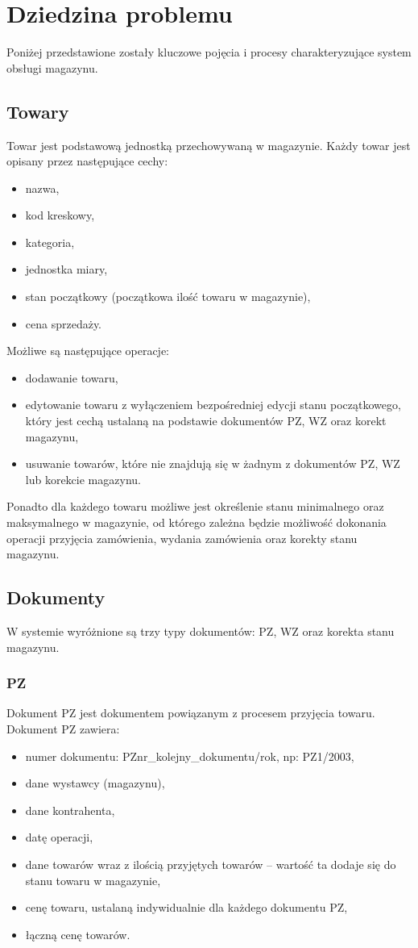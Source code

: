 \section{Dziedzina problemu}
Poniżej przedstawione zostały kluczowe pojęcia i procesy charakteryzujące system obsługi magazynu.

\subsection{Towary}
Towar jest podstawową jednostką przechowywaną w magazynie. Każdy towar jest opisany przez następujące cechy:
\begin{itemize}
	\item nazwa,
	\item kod kreskowy,
	\item kategoria,
	\item jednostka miary,
	\item stan początkowy (początkowa ilość towaru w magazynie),
	\item cena sprzedaży.
\end{itemize}

Możliwe są następujące operacje:
\begin{itemize}
	\item dodawanie towaru,
	\item edytowanie towaru z wyłączeniem bezpośredniej edycji stanu początkowego, który jest cechą ustalaną na podstawie dokumentów PZ, WZ oraz korekt magazynu,
	\item usuwanie towarów, które nie znajdują się w żadnym z dokumentów PZ, WZ lub korekcie magazynu.
\end{itemize}

Ponadto dla każdego towaru możliwe jest określenie stanu minimalnego oraz maksymalnego w magazynie, od którego zależna będzie możliwość dokonania operacji przyjęcia zamówienia, wydania zamówienia oraz korekty stanu magazynu.

\subsection{Dokumenty}
W systemie wyróżnione są trzy typy dokumentów: PZ, WZ oraz korekta stanu magazynu.

\subsubsection{PZ}
Dokument PZ jest dokumentem powiązanym z procesem przyjęcia towaru.
Dokument PZ zawiera:
\begin{itemize}
	\item numer dokumentu: PZnr\_kolejny\_dokumentu/rok, np: PZ1/2003,
	\item dane wystawcy (magazynu),
	\item dane kontrahenta,
	\item datę operacji,
	\item dane towarów wraz z ilością przyjętych towarów -- wartość ta dodaje się do stanu towaru w magazynie,
	\item cenę towaru, ustalaną indywidualnie dla każdego dokumentu PZ,
	\item łączną cenę towarów.
\end{itemize}

